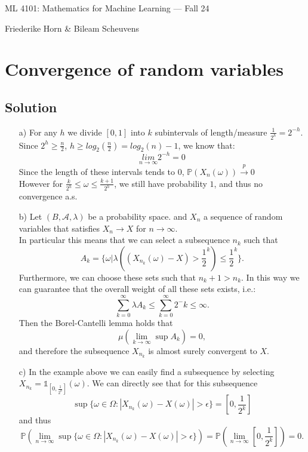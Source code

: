 \documentclass[10pt]{article}
\numberwithin{equation}{section}
\begin{document}
\begin{center}
    \sc ML 4101: Mathematics for Machine Learning --- Fall 24
\end{center}

\noindent Friederike Horn \& Bileam Scheuvens

\section*{Convergence of random variables}

\subsection*{Solution}
\begin{enumerate}
  \item[a)]{
    For any $h$ we divide $[0,1]$ into $k$ subintervals of length/measure $\frac{1}{2^h} = 2^{-h}$.\\
      Since $2^h \geq \frac{n}{2}$, $h \geq log_2(\frac{n}{2}) = log_2(n) - 1$, we know that:
      $$\underset{n\rightarrow \infty}{lim} 2^{-h} = 0$$
      Since the length of these intervals tends to $0$, $\mathbb{P}(X_n(\omega)) \overset{p}{\rightarrow} 0$\\
      However for $\frac{k}{2^h} \leq \omega \leq \frac{k+1}{2^h}$, we still have probability $1$, and thus no convergence a.s.
    }
  \item[b)]{
 Let $(B, \mathcal{A}, \lambda)$ be a probability space. and $X_n$ a sequence of random variables that satisfies $X_n \to X$ for $n\to \infty$. \\
 In particular this means that we can select a subsequence $n_k$ such that
$$
A_k = \{\omega | \lambda((X_{n_k}(\omega)-X)>\frac{1}{2}^k) \leq \frac{1}{2}^k\}.
$$Furthermore, we can choose these sets such that $n_k+1> n_k$. 
In this way we can guarantee that the overall weight of all these sets exists, i.e.: 
$$
\sum_{k=0}^\infty \lambda{A_k} \leq \sum_{k=0}^\infty 2^-k \leq \infty. 
$$
Then the Borel-Cantelli lemma holds that 
$$
\mu(\lim_{k \to \infty} \sup A_k) = 0,
$$
and therefore the subsequence $X_{n_k}$ is almost surely convergent to $X$. 
  }
  \item[c)]{
  In the example above we can easily find a subsequence by selecting $X_{n_k} = \mathbb{1}_{[0, \frac{1}{2^h}]}(\omega)$. We can directly see that for this subsequence 
  $$\sup \{ \omega \in \Omega : |X_{n_k}(\omega)-X(\omega)|>\epsilon\} = [0, \frac{1}{2^k}]$$
   and thus 
   $$
   \mathbb{P}\left(\lim_{n \to \infty} \sup \{ \omega \in \Omega : |X_{n_k}(\omega)-X(\omega)|>\epsilon\}\right) = \mathbb{P}\left(\lim_{n \to \infty} [0, \frac{1}{2^k}]\right)
= 0.$$
  }
\end{enumerate}
\end{document}

